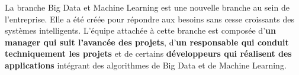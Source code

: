 La branche Big Data et Machine Learning est une nouvelle branche au sein de l’entreprise. Elle a été créée pour répondre aux besoins sans cesse croissants des systèmes intelligents. L’équipe attachée à cette branche est composée d’\textbf{un manager qui suit l’avancée des projets}, d’\textbf{un responsable qui conduit techniquement les projets} et de certains \textbf{développeurs qui réalisent des applications} intégrant des algorithmes de Big Data et de Machine Learning.